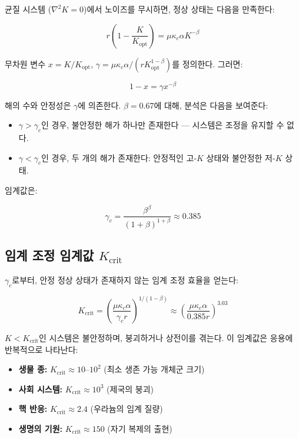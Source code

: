 \documentclass[12pt,a4paper]{article}
\newcommand{\Keffopt}{K_{\mathrm{opt}}}
\newcommand{\Keffcrit}{K_{\mathrm{crit}}}
\newcommand{\kappac}{\kappa_c}
\theoremstyle{remark}
\begin{document}
	균질 시스템 (\(\nabla^2 K = 0\))에서 노이즈를 무시하면, 정상 상태는 다음을 만족한다:
	
	\begin{equation}
		r \left(1 - \frac{K}{\Keffopt}\right) = \mu \kappac \alpha K^{-\beta}
		\label{eq:stationary}
	\end{equation}
	
	무차원 변수 \(x = K/\Keffopt\), \(\gamma = \mu \kappac \alpha / (r \Keffopt^{1-\beta})\)를 정의한다. 그러면:
	
	\begin{equation}
		1 - x = \gamma x^{-\beta}
		\label{eq:dimensionless}
	\end{equation}
	
	해의 수와 안정성은 \(\gamma\)에 의존한다. \(\beta = 0.67\)에 대해, 분석은 다음을 보여준다:
	
	\begin{itemize}
		\item \(\gamma > \gamma_c\)인 경우, 불안정한 해가 하나만 존재한다 — 시스템은 조정을 유지할 수 없다.
		\item \(\gamma < \gamma_c\)인 경우, 두 개의 해가 존재한다: 안정적인 고-\(K\) 상태와 불안정한 저-\(K\) 상태.
	\end{itemize}
	
	임계값은:
	
	\begin{equation}
		\gamma_c = \frac{\beta^{\beta}}{(1+\beta)^{1+\beta}} \approx 0.385
		\label{eq:gamma_c}
	\end{equation}
	
	\subsection{임계 조정 임계값 \(\Keffcrit\)}
	
	\(\gamma_c\)로부터, 안정 정상 상태가 존재하지 않는 임계 조정 효율을 얻는다:
	
	\begin{equation}
		\Keffcrit = \left( \frac{\mu \kappac \alpha}{\gamma_c r} \right)^{1/(1-\beta)} \approx \left( \frac{\mu \kappac \alpha}{0.385 r} \right)^{3.03}
		\label{eq:Kcrit}
	\end{equation}
	
	\(K < \Keffcrit\)인 시스템은 불안정하며, 붕괴하거나 상전이를 겪는다. 이 임계값은 응용에 반복적으로 나타난다:
	
	\begin{itemize}
		\item \textbf{생물 종:} \(\Keffcrit \approx 10\)--\(10^2\) (최소 생존 가능 개체군 크기)
		\item \textbf{사회 시스템:} \(\Keffcrit \approx 10^3\) (제국의 붕괴)
		\item \textbf{핵 반응:} \(\Keffcrit \approx 2.4\) (우라늄의 임계 질량)
		\item \textbf{생명의 기원:} \(\Keffcrit \approx 150\) (자기 복제의 출현)
	\end{itemize}
	
\end{document}

